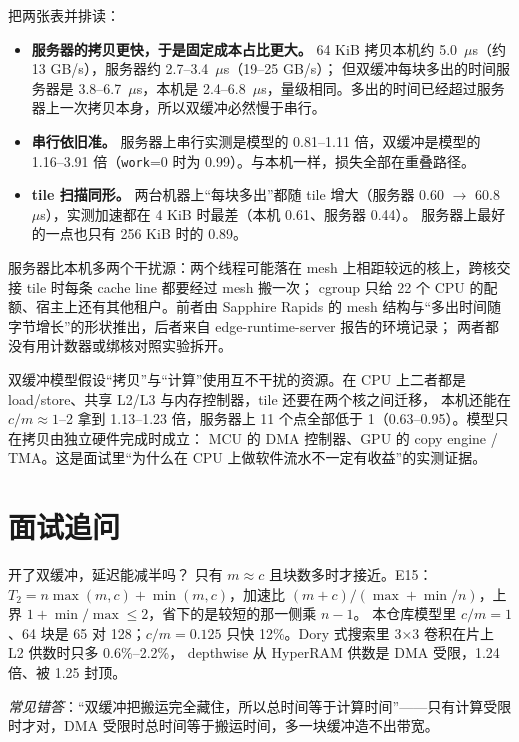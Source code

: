 \documentclass[11pt,a4paper]{ctexart}
\begin{document}
把两张表并排读：
\begin{itemize}
  \item \textbf{服务器的拷贝更快，于是固定成本占比更大。} 64 KiB 拷贝本机约 5.0~$\mu$s（约 13 GB/s），服务器约 2.7--3.4~$\mu$s（19--25 GB/s）；
        但双缓冲每块多出的时间服务器是 3.8--6.7~$\mu$s，本机是 2.4--6.8~$\mu$s，量级相同。多出的时间已经超过服务器上一次拷贝本身，所以双缓冲必然慢于串行。
  \item \textbf{串行依旧准。} 服务器上串行实测是模型的 0.81--1.11 倍，双缓冲是模型的 1.16--3.91 倍（\texttt{work}=0 时为 0.99）。与本机一样，损失全部在重叠路径。
  \item \textbf{tile 扫描同形。} 两台机器上“每块多出”都随 tile 增大（服务器 0.60 $\to$ 60.8~$\mu$s），实测加速都在 4 KiB 时最差（本机 0.61、服务器 0.44）。
        服务器上最好的一点也只有 256 KiB 时的 0.89。
\end{itemize}

服务器比本机多两个干扰源：两个线程可能落在 mesh 上相距较远的核上，跨核交接 tile 时每条 cache line 都要经过 mesh 搬一次；
cgroup 只给 22 个 CPU 的配额、宿主上还有其他租户。前者由 Sapphire Rapids 的 mesh 结构与“多出时间随字节增长”的形状推出，后者来自 edge-runtime-server 报告的环境记录；
两者都没有用计数器或绑核对照实验拆开。

\begin{findingbox}
双缓冲模型假设“拷贝”与“计算”使用互不干扰的资源。在 CPU 上二者都是 load/store、共享 L2/L3 与内存控制器，tile 还要在两个核之间迁移，
本机还能在 $c/m\approx1$--2 拿到 1.13--1.23 倍，服务器上 11 个点全部低于 1（0.63--0.95）。模型只在拷贝由独立硬件完成时成立：
MCU 的 DMA 控制器、GPU 的 copy engine / TMA。这是面试里“为什么在 CPU 上做软件流水不一定有收益”的实测证据。
\end{findingbox}

\section{面试追问}\label{sec:iq}

\begin{iqbox}{开了双缓冲，延迟能减半吗？}
只有 $m\approx c$ 且块数多时才接近。E15：$T_2 = n\max(m,c)+\min(m,c)$，加速比 $(m+c)/(\max+\min/n)$，上界 $1+\min/\max\le2$，省下的是较短的那一侧乘 $n-1$。
本仓库模型里 $c/m=1$、64 块是 65 对 128；$c/m=0.125$ 只快 12\%。Dory 式搜索里 3×3 卷积在片上 L2 供数时只多 0.6\%--2.2\%，
depthwise 从 HyperRAM 供数是 DMA 受限，1.24 倍、被 1.25 封顶。

\emph{常见错答}：“双缓冲把搬运完全藏住，所以总时间等于计算时间”——只有计算受限时才对，DMA 受限时总时间等于搬运时间，多一块缓冲造不出带宽。
\end{iqbox}
\end{document}
